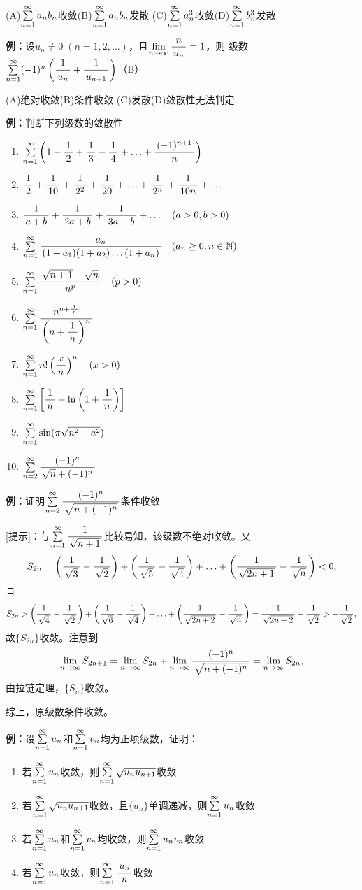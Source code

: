 \quad (A)\;$\sumn a_nb_n$收敛\quad(B)\;$\sumn a_nb_n$发散
\quad (C)\;$\sumn a_n^3$收敛\quad(D)\;$\sumn b_n^3$发散

{\bf 例：}设$u_n\ne0\;(n=1,2,\ldots)$，且$\limn\df n{u_n}=1$，则
级数$\sumn(-1)^n\left(\df1{u_n}+\df1{u_{n+1}}\right)$（B）

\quad (A)\;绝对收敛\quad(B)\;条件收敛
\quad (C)\;发散\quad(D)\;敛散性无法判定


{\bf 例：}判断下列级数的敛散性
\begin{enumerate}[(1)]
  \setlength{\itemindent}{1cm}
  \item $\sumn\left(1-\df12+\df13-\df14+\ldots+\df{(-1)^{n+1}}n\right)$
  \item $\df12+\df1{10}+\df1{2^2}+\df1{20}+\ldots+\df1{2^n}+\df1{10n}+\ldots$
  \item $\df 1{a+b}+\df 1{2a+b}+\df 1{3a+b}+\ldots\quad (a>0,b>0)$
  \item $\sumn\df {a_n}{(1+a_1)(1+a_2)\ldots(1+a_n)}\quad(a_n\geq
	  0,n\in\mathbb{N})$
  \item $\sumn\df{\sqrt{n+1}-\sqrt{n}}{n^p}\quad(p>0)$
  \item $\sumn\df{n^{n+\frac 1{\,n\,}}}{\left(n+\df 1n\right)^n}$
  \item $\sumn n!\left(\df{x}{n}\right)^n\quad (x>0)$
  \item $\sumn\left[\df 1n-\ln\left(1+\df 1n\right)\right]$
  \item $\sumn\sin(\pi\sqrt{n^2+a^2})$
  \item $\sum\limits_{n=2}^{\infty}\df{(-1)^n}{\sqrt n+(-1)^n}$
\end{enumerate}

{\bf 例：}证明$\sum\limits_{n=2}^{\infty}\df{(-1)^n}{\sqrt{n+(-1)^n}}$条件收敛

[提示]：与$\sumn\df1{\sqrt{n+1}}$比较易知，该级数不绝对收敛。又
$$S_{2n}=\left(\df1{\sqrt{3}}-\df1{\sqrt{2}}\right)
+\left(\df1{\sqrt{5}}-\df1{\sqrt{4}}\right)+\ldots
+\left(\df1{\sqrt{2n+1}}-\df1{\sqrt{n}}\right)<0,$$
且
$$S_{2n}>\left(\df1{\sqrt{4}}-\df1{\sqrt{2}}\right)
+\left(\df1{\sqrt{6}}-\df1{\sqrt{4}}\right)+\ldots
+\left(\df1{\sqrt{2n+2}}-\df1{\sqrt{n}}\right)
=\df1{\sqrt{2n+2}}-\df1{\sqrt{2}}>-\df1{\sqrt{2}},$$
故$\{S_{2n}\}$收敛。注意到
$$\limn S_{2n+1}=\limn S_{2n}+\limn\df{(-1)^n}{\sqrt{n+(-1)^n}}=\limn S_{2n},$$
由拉链定理，$\{S_n\}$收敛。

综上，原级数条件收敛。

{\bf 例：}设$\sumn u_n$和$\sumn v_n$均为正项级数，证明：
\begin{enumerate}[(1)]
  \setlength{\itemindent}{1cm}
  \item 若$\sumn u_n$收敛，则$\sumn\sqrt{u_nu_{n+1}}$收敛
  \item 若$\sumn\sqrt{u_nu_{n+1}}$收敛，且$\{u_n\}$单调递减，则$\sumn u_n$收敛
  \item 若$\sumn u_n$和$\sumn v_n$均收敛，则$\sumn u_nv_n$收敛
  \item 若$\sumn u_n$收敛，则$\sumn \df{u_n}n$收敛
\end{enumerate}

